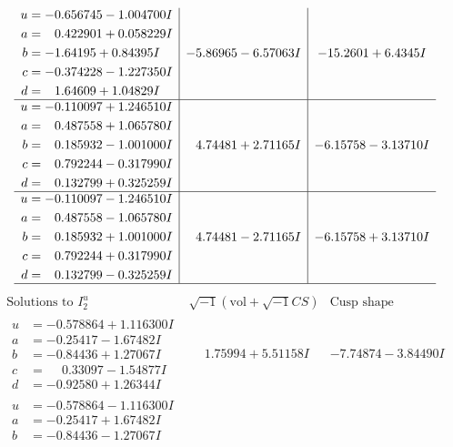 \documentclass[1p]{elsarticle_modified}
\theoremstyle{definition}
\newcommand{\I}{\sqrt{-1}}
\begin{document}
$$\begin{array}{c|c|c}
\begin{aligned}
u &= -0.656745 - 1.004700 I \\
a &= \phantom{-}0.422901 + 0.058229 I \\
b &= -1.64195 + 0.84395 I \\
c &= -0.374228 - 1.227350 I \\
d &= \phantom{-}1.64609 + 1.04829 I\end{aligned}
 & -5.86965 - 6.57063 I & -15.2601 + 6.4345 I \\ \hline\begin{aligned}
u &= -0.110097 + 1.246510 I \\
a &= \phantom{-}0.487558 + 1.065780 I \\
b &= \phantom{-}0.185932 - 1.001000 I \\
c &= \phantom{-}0.792244 - 0.317990 I \\
d &= \phantom{-}0.132799 + 0.325259 I\end{aligned}
 & \phantom{-}4.74481 + 2.71165 I & -6.15758 - 3.13710 I \\ \hline\begin{aligned}
u &= -0.110097 - 1.246510 I \\
a &= \phantom{-}0.487558 - 1.065780 I \\
b &= \phantom{-}0.185932 + 1.001000 I \\
c &= \phantom{-}0.792244 + 0.317990 I \\
d &= \phantom{-}0.132799 - 0.325259 I\end{aligned}
 & \phantom{-}4.74481 - 2.71165 I & -6.15758 + 3.13710 I\\
 \hline 
 \end{array}$$\newpage$$\begin{array}{c|c|c}  
\text{Solutions to }I^u_{2}& \I (\text{vol} + \sqrt{-1}CS) & \text{Cusp shape}\\
 \hline 
\begin{aligned}
u &= -0.578864 + 1.116300 I \\
a &= -0.25417 - 1.67482 I \\
b &= -0.84436 + 1.27067 I \\
c &= \phantom{-}0.33097 - 1.54877 I \\
d &= -0.92580 + 1.26344 I\end{aligned}
 & \phantom{-}1.75994 + 5.51158 I & -7.74874 - 3.84490 I \\ \hline\begin{aligned}
u &= -0.578864 - 1.116300 I \\
a &= -0.25417 + 1.67482 I \\
b &= -0.84436 - 1.27067 I \\

\end{aligned}
\end{array}$$
\end{document}
